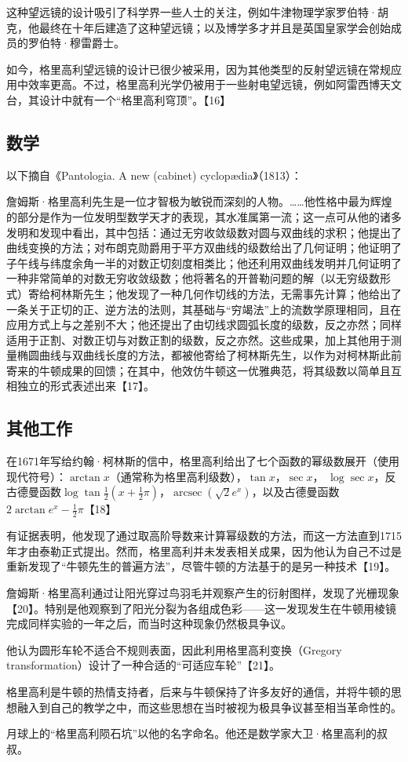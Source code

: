 这种望远镜的设计吸引了科学界一些人士的关注，例如牛津物理学家罗伯特·胡克，他最终在十年后建造了这种望远镜；以及博学多才并且是英国皇家学会创始成员的罗伯特·穆雷爵士。

如今，格里高利望远镜的设计已很少被采用，因为其他类型的反射望远镜在常规应用中效率更高。不过，格里高利光学仍被用于一些射电望远镜，例如阿雷西博天文台，其设计中就有一个“格里高利穹顶”。【16】
\subsection{数学}
以下摘自《Pantologia. A new (cabinet) cyclopædia》（1813）：

詹姆斯·格里高利先生是一位才智极为敏锐而深刻的人物。……他性格中最为辉煌的部分是作为一位发明型数学天才的表现，其水准属第一流；这一点可从他的诸多发明和发现中看出，其中包括：通过无穷收敛级数对圆与双曲线的求积；他提出了曲线变换的方法；对布朗克勋爵用于平方双曲线的级数给出了几何证明；他证明了子午线与纬度余角一半的对数正切刻度相类比；他还利用双曲线发明并几何证明了一种非常简单的对数无穷收敛级数；他将著名的开普勒问题的解（以无穷级数形式）寄给柯林斯先生；他发现了一种几何作切线的方法，无需事先计算；他给出了一条关于正切的正、逆方法的法则，其基础与“穷竭法”上的流数学原理相同，且在应用方式上与之差别不大；他还提出了由切线求圆弧长度的级数，反之亦然；同样适用于正割、对数正切与对数正割的级数，反之亦然。这些成果，加上其他用于测量椭圆曲线与双曲线长度的方法，都被他寄给了柯林斯先生，以作为对柯林斯此前寄来的牛顿成果的回馈；在其中，他效仿牛顿这一优雅典范，将其级数以简单且互相独立的形式表述出来【17】。
\subsection{其他工作}
在1671年写给约翰·柯林斯的信中，格里高利给出了七个函数的幂级数展开（使用现代符号）：$\arctan x $（通常称为格里高利级数），$\tan x$，$\sec x$， 
$\log \sec x$，反古德曼函数$\log \tan \tfrac{1}{2}\left(x+\tfrac{1}{2}\pi\right)$，$\operatorname{arcsec}\!\left(\sqrt{2}e^x\right)$，以及古德曼函数$2\arctan e^x - \tfrac{1}{2}\pi$【18】  

有证据表明，他发现了通过取高阶导数来计算幂级数的方法，而这一方法直到1715年才由泰勒正式提出。然而，格里高利并未发表相关成果，因为他认为自己不过是重新发现了“牛顿先生的普遍方法”，尽管牛顿的方法基于的是另一种技术【19】。  

詹姆斯·格里高利通过让阳光穿过鸟羽毛并观察产生的衍射图样，发现了光栅现象【20】。特别是他观察到了阳光分裂为各组成色彩——这一发现发生在牛顿用棱镜完成同样实验的一年之后，而当时这种现象仍然极具争议。  

他认为圆形车轮不适合不规则表面，因此利用格里高利变换（Gregory transformation）设计了一种合适的“可适应车轮”【21】。  

格里高利是牛顿的热情支持者，后来与牛顿保持了许多友好的通信，并将牛顿的思想融入到自己的教学之中，而这些思想在当时被视为极具争议甚至相当革命性的。  

月球上的“格里高利陨石坑”以他的名字命名。他还是数学家大卫·格里高利的叔叔。  

